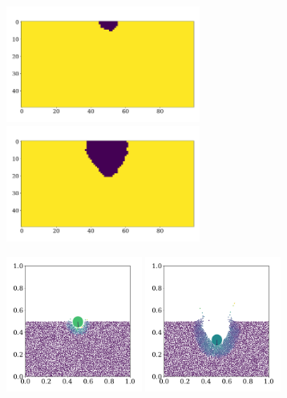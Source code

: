 \documentclass{article}
\begin{document}
    \begin{figure}[H]
        \centering
        \begin{subfigure}{.4\textwidth}                    
            \includegraphics[width=0.7\textwidth]{../plots/problem4/crater1.pdf}
            \includegraphics[width=0.7\textwidth]{../plots/problem4/crater19.pdf}
        \end{subfigure}
        \begin{subfigure}{.59\textwidth}                    
            \includegraphics[width=0.49\textwidth]{../plots/problem4/particles1.pdf}
            \includegraphics[width=0.49\textwidth]{../plots/problem4/particles19.pdf}

\end{subfigure}
\end{figure}
\end{document}
